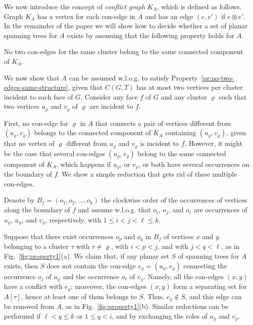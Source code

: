 \documentclass[letter,runningheads]{llncs}
\newcommand{\conf}{\otimes}
\begin{document}
We now introduce the concept of {\em conflict graph} $K_A$, which is defined as follows. Graph $K_A$ has a vertex for each con-edge in $A$ and has an edge $(e,e')$ if $e\conf e'$. In the remainder of the paper we will show how to decide whether a set of planar spanning trees for $A$ exists by assuming that the following property holds for $A$.

\begin{prop} \label{pr:no-two-edges-same-structure}
No two con-edges for the same cluster belong to the same connected component of $K_A$.
\end{prop}

We now show that $A$ can be assumed w.l.o.g. to satisfy Property~\ref{pr:no-two-edges-same-structure}, given that $C(G,T)$ has at most two vertices per cluster incident to each face of $G$. Consider any face $f$ of $G$ and any cluster $\varrho$ such that two vertices $u_{\varrho}$ and $v_{\varrho}$ of $\varrho$ are incident to $f$.

First, no con-edge for $\varrho$ in $A$ that connects a pair of vertices different from $(u_{\varrho},v_{\varrho})$ belongs to the connected component of $K_A$ containing $(u_{\varrho},v_{\varrho})$, given that no vertex of $\varrho$ different from $u_{\varrho}$ and $v_{\varrho}$ is incident to $f$. However, it might be the case that several con-edges $(u_{\varrho},v_{\varrho})$ belong to the same connected component of $K_A$, which happens if $u_{\varrho}$, or $v_{\varrho}$, or both have several occurrences on the boundary of $f$. We show a simple reduction that gets rid of these multiple con-edges.

Denote by $B_f=(o_1,o_2,\dots,o_k)$ the clockwise order of the occurrences of vertices along the boundary of $f$ and assume w.l.o.g. that $o_i$, $o_j$, and $o_\ell$ are occurrences of  $u_{\varrho}$, $u_{\varrho}$, and $v_{\varrho}$, respectively, with $1\leq i< j< \ell\leq k$.

Suppose that there exist occurrences $o_p$ and $o_q$ in $B_f$ of vertices $x$ and $y$ belonging to a cluster $\tau$ with $\tau\neq \varrho$, with $i<p<j$, and with $j<q<\ell$, as in Fig.~\ref{fig:property1}(a). We claim that, if any planar set $S$ of spanning trees for $A$ exists, then $S$ does not contain the con-edge $e_{\varrho}=(u_{\varrho},v_{\varrho})$ connecting the occurrence $o_j$ of $u_{\varrho}$ and the occurrence $o_\ell$ of $v_{\varrho}$. Namely, all the con-edges $(x,y)$ have a conflict with $e_{\varrho}$; moreover, the con-edges $(x,y)$ form a separating set for $A[\tau]$, hence at least one of them belongs to $S$. Thus, $e_{\varrho}\notin S$, and this edge can be removed from $A$, as in Fig.~\ref{fig:property1}(b). Similar reductions can be performed if $\ell<q\leq k$ or $1\leq q<i$, and by exchanging the roles of $u_{\varrho}$ and $v_{\varrho}$.
\end{document}
